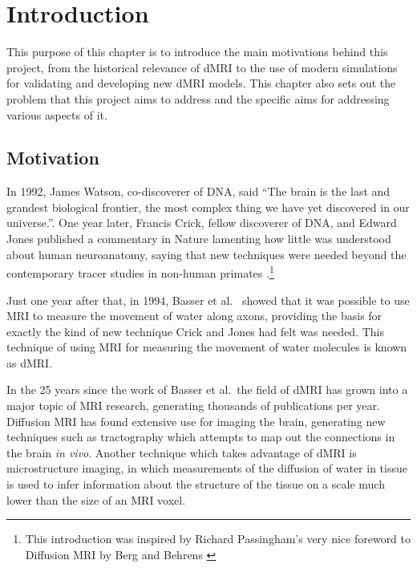 \renewcommand{\LifeChapter}{y}
\chapter{Introduction}
\label{chap:introduction}

\chaptertoc{}

\begin{chapterabstract}
  This purpose of this chapter is to introduce the main motivations behind this project, from the historical relevance of \acl{dMRI} to the use of modern simulations for validating and developing new \acl{dMRI} models.
  This chapter also sets out the problem that this project aims to address and the specific aims for addressing various aspects of it.
\end{chapterabstract}

\section{Motivation}
\label{sec:intro_motivation}
In 1992, James Watson, co-discoverer of DNA, said ``The brain is the last and grandest biological frontier, the most complex thing we have yet discovered in our universe.''\cite{NAP1785}.
One year later, Francis Crick, fellow discoverer of DNA, and Edward Jones published a commentary in Nature lamenting how little was understood about human neuroanatomy, saying that new techniques were needed beyond the contemporary tracer studies in non-human primates \cite{Crick1993}.\footnote{This introduction was inspired by Richard Passingham's very nice foreword to Diffusion MRI by Berg and Behrens \cite{Johansen-Berg2013}}

Just one year after that, in 1994, Basser et al.\ \cite{Basser1994} showed that it was possible to use \ac{MRI} to measure the movement of water along axons, providing the basis for exactly the kind of new technique Crick and Jones had felt was needed.
This technique of using \ac{MRI} for measuring the movement of water molecules is known as \ac{dMRI}.

In the 25 years since the work of Basser et al.\ the field of \acl{dMRI} has grown into a major topic of \ac{MRI} research, generating thousands of publications per year.
Diffusion MRI has found extensive use for imaging the brain, generating new techniques such as tractography which attempts to map out the connections in the brain \emph{in vivo}.
Another technique which takes advantage of \ac{dMRI} is microstructure imaging, in which measurements of the diffusion of water in tissue is used to infer information about the structure of the tissue on a scale much lower than the size of an MRI voxel.

